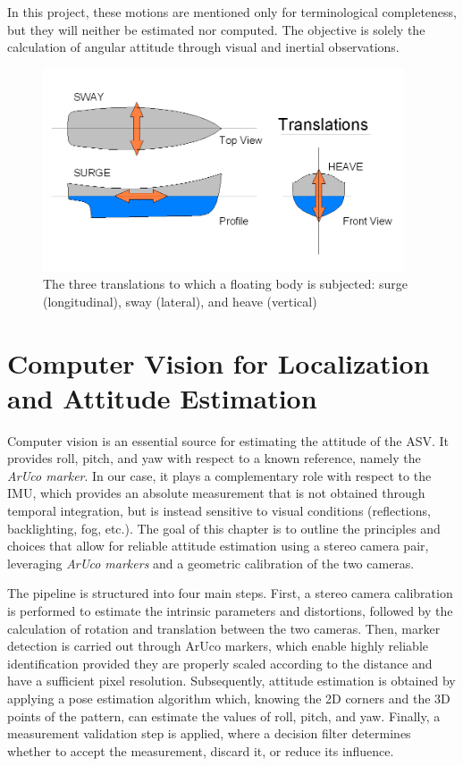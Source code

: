 In this project, these motions are mentioned only for terminological completeness, but they will neither be estimated nor computed. The objective is solely the calculation of angular attitude through visual and inertial observations.

\begin{figure}[ht]
  \centering
  \includegraphics[height=6cm]{images/Translations.png}
  \caption{The three translations to which a floating body is subjected: surge (longitudinal), sway (lateral), and heave (vertical)}\label{unipd-logo}
\end{figure}


\section[Computer Vision and Attitude Estimation]{Computer Vision for Localization and Attitude Estimation}

Computer vision is an essential source for estimating the attitude of the ASV. 
It provides roll, pitch, and yaw with respect to a known reference, namely the \textit{ArUco marker}. 
In our case, it plays a complementary role with respect to the IMU, 
which provides an absolute measurement that is not obtained through temporal integration, 
but is instead sensitive to visual conditions (reflections, backlighting, fog, etc.). 
The goal of this chapter is to outline the principles and choices that allow for reliable 
attitude estimation using a stereo camera pair, leveraging \textit{ArUco markers} 
and a geometric calibration of the two cameras.

The pipeline is structured into four main steps. First, a stereo camera calibration is performed to estimate the intrinsic parameters and distortions, followed by the calculation of rotation and translation between the two cameras. Then, marker detection is carried out through ArUco markers, which enable highly reliable identification provided they are properly scaled according to the distance and have a sufficient pixel resolution. Subsequently, attitude estimation is obtained by applying a pose estimation algorithm which, knowing the 2D corners and the 3D points of the pattern, can estimate the values of roll, pitch, and yaw. Finally, a measurement validation step is applied, where a decision filter determines whether to accept the measurement, discard it, or reduce its influence.


